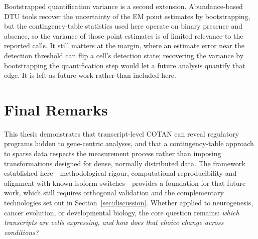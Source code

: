 Bootstrapped quantification variance is a second extension. Abundance-based DTU tools recover the uncertainty of the EM point estimates by bootstrapping, but the contingency-table statistics used here operate on binary presence and absence, so the variance of those point estimates is of limited relevance to the reported calls. It still matters at the margin, where an estimate error near the detection threshold can flip a cell's detection state; recovering the variance by bootstrapping the quantification step would let a future analysis quantify that edge. It is left as future work rather than included here.

\section*{Final Remarks}

This thesis demonstrates that transcript-level COTAN can reveal regulatory programs hidden to gene-centric analyses, and that a contingency-table approach to sparse data respects the measurement process rather than imposing transformations designed for dense, normally distributed data. The framework established here---methodological rigour, computational reproducibility and alignment with known isoform switches---provides a foundation for that future work, which still requires orthogonal validation and the complementary technologies set out in Section~\ref{sec:discussion}. Whether applied to neurogenesis, cancer evolution, or developmental biology, the core question remains: \textit{which transcripts are cells expressing, and how does that choice change across conditions?}